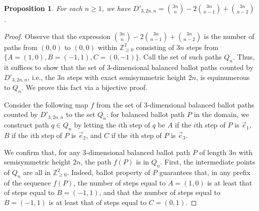 \documentclass[11pt]{article}
\newtheorem{proposition}[theorem]{Proposition}
\theoremstyle{remark}
\theoremstyle{definition}
\begin{document}
\begin{proposition}\label{prop:NotTightExample}
    For each $n \geq 1$, we have $D'_{3, 2n, n} = \binom{3n}{n} - 2\binom{3n}{n-1} + \binom{3n}{n-2}$.
\end{proposition}
\begin{proof}
     Observe that the expression $\binom{3n}{n} - 2\binom{3n}{n-1} + \binom{3n}{n-2}$ is the number of paths from $(0, 0)$ to $(0, 0)$ within $\mathbb{Z}_{\geq 0}^2$ consisting of $3n$ steps from $\{A=(1, 0), B= (-1, 1), C=(0, -1)\}$. Call the set of such paths $Q_{n}$. Thus, it suffices to show that the set of $3$-dimensional balanced ballot paths counted by $D'_{3, 2n, n}$, i.e., the $3n$ steps with exact semisymmetric height  $2n$, is equinumerous to $Q_n$. We prove this fact via a bijective proof.

    Consider the following map $f$ from the set  of $3$-dimensional balanced ballot paths counted by $D'_{3, 2n, n}$ to the set $Q_n$: for balanced ballot path $P$ in the domain, we construct path $q \in Q_n$ by letting the $i$th step of $q$ be $A$ if the $i$th step of $P$ is $\vec{e}_1$, $B$ if the $i$th step of $P$ is $\vec{e}_2$, and $C$ if the $i$th step of $P$ is $\vec{e}_3$. 
    
    We confirm that, for any 3-dimensional balanced ballot path $P$ of length $3n$ with semisymmetric height $2n$, the path  $f(P)$ is in $Q_n$. First, the intermediate points of $Q_n$ are all in $\mathbb{Z}_{\geq 0}^2$. Indeed, ballot property of $P$ guarantees that, in any prefix of the sequence $f(P)$, the number of steps equal to $A = (1, 0)$ is at least that of steps equal to $B = (-1, 1)$, and that the number of steps equal to $B = (-1, 1)$ is at least that of steps equal to $C = (0, 1)$.
    

\end{proof}
\end{document}

